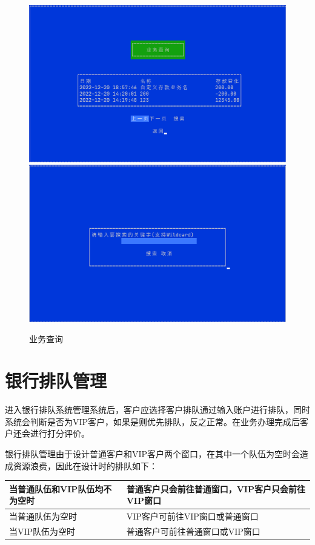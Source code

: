\documentclass{ctexrep}
\begin{document}
\begin{figure}[H]
  \centering\includegraphics[scale=0.38]{preview_transaction_menu.png}
  \includegraphics[scale=0.38]{preview_transaction_search.png}
  \caption{业务查询}
\end{figure}

\section{银行排队管理}
进入银行排队系统管理系统后，客户应选择客户排队通过输入账户进行排队，同时系统会判断是否为VIP客户，如果是则优先排队，反之正常。在业务办理完成后客户还会进行打分评价。

银行排队管理由于设计普通客户和VIP客户两个窗口，在其中一个队伍为空时会造成资源浪费，因此在设计时的排队如下：


\begin{center}
  \begin{tabular}{|p{3.5cm} p{7.5cm}|}
    \hline 当普通队伍和VIP队伍均不为空时 & 普通客户只会前往普通窗口，VIP客户只会前往VIP窗口 \\
    \hline 当普通队伍为空时              & VIP客户可前往VIP窗口或普通窗口                   \\
    \hline 当VIP队伍为空时               & 普通客户可前往普通窗口或VIP窗口                  \\
    \hline
  \end{tabular}
\end{center}
\end{document}
